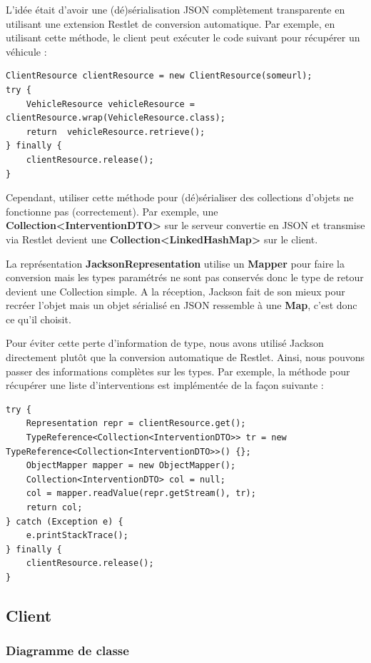 \documentclass{article}
\begin{document}
L’idée était d’avoir une (dé)sérialisation JSON complètement transparente en utilisant une extension Restlet de conversion automatique. Par exemple, en utilisant cette méthode, le client peut exécuter le code suivant pour récupérer un véhicule :


\begin{lstlisting}
ClientResource clientResource = new ClientResource(someurl);
try {
    VehicleResource vehicleResource = clientResource.wrap(VehicleResource.class);
    return  vehicleResource.retrieve();
} finally {
    clientResource.release();
}
\end{lstlisting}


Cependant, utiliser cette méthode pour (dé)sérialiser des collections d’objets ne fonctionne pas (correctement). Par exemple, une \textbf{Collection<InterventionDTO>} sur le serveur convertie en JSON et transmise via Restlet devient une \textbf{Collection<LinkedHashMap>} sur le client.

La représentation \textbf{JacksonRepresentation} utilise un \textbf{Mapper} pour faire la conversion mais les types paramétrés ne sont pas conservés donc le type de retour devient une Collection simple. A la réception, Jackson fait de son mieux pour recréer l’objet mais un objet sérialisé en JSON ressemble à une \textbf{Map}, c’est donc ce qu’il choisit.

Pour éviter cette perte d’information de type, nous avons utilisé Jackson directement plutôt que la conversion automatique de Restlet. Ainsi, nous pouvons passer des informations complètes sur les types. Par exemple, la méthode pour récupérer une liste d’interventions est implémentée de la façon suivante :

\begin{lstlisting}
try {
    Representation repr = clientResource.get();
    TypeReference<Collection<InterventionDTO>> tr = new TypeReference<Collection<InterventionDTO>>() {};
    ObjectMapper mapper = new ObjectMapper();
    Collection<InterventionDTO> col = null;
    col = mapper.readValue(repr.getStream(), tr);
    return col;
} catch (Exception e) {
    e.printStackTrace();
} finally {
    clientResource.release();
}
\end{lstlisting}


\subsection{Client}

\subsubsection{Diagramme de classe}
\end{document}
